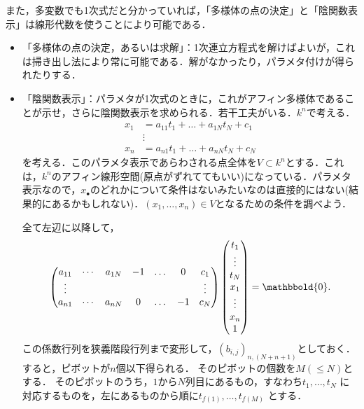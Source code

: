 \documentclass[9pt]{ltjsarticle}
\newcommand{\bbold}{\mathbbold}
\begin{document}
また，多変数でも1次式だと分かっていれば，「多様体の点の決定」と「陰関数表示」は線形代数を使うことにより可能である．
\begin{itemize}
 \item 「多様体の点の決定，あるいは求解」：1次連立方程式を解けばよいが，これは掃き出し法により常に可能である．解がなかったり，パラメタ付けが得られたりする．
 \item 「陰関数表示」：パラメタが1次式のときに，これがアフィン多様体であることが示せ，さらに陰関数表示を求められる．若干工夫がいる．$k^n$で考える．
\begin{align}
 x_1 &=  a_{11} t_1 + \dots + a_{1N}t_N + c_1\\
 & \vdots\\
 x_n & = a_{n1} t_1 + \dots + a_{nN}t_N + c_N
\end{align}
を考える．このパラメタ表示であらわされる点全体を$V\subset k^n$とする．これは，$k^n$のアフィン線形空間(原点がずれててもいい)になっている．パラメタ表示なので，$x_\bullet$のどれかについて条件はないみたいなのは直接的にはない(結果的にあるかもしれない)．$(x_1,\dots,x_n)\in V$となるための条件を調べよう．

全て左辺に以降して，
\begin{align}
\begin{pmatrix}
 a_{11} & \cdots & a_{1N} & -1 & \dots & 0 & c_1\\
 \vdots& & & & & & \vdots\\
 a_{n1} & \cdots & a_{nN} & 0 & \dots & -1 & c_N
\end{pmatrix}
\tatev{t_1 \\ \vdots \\ t_N \\ x_1 \\ \vdots \\ x_n \\ 1}
 =
\bbold{0}.
\end{align}
この係数行列を狭義階段行列まで変形して，$(b_{i,j})_{n,(N+n+1)}$としておく．すると，ピボットが$n$個以下得られる．
そのピボットの個数を$M(\le N)$とする．
そのピボットのうち，$1$から$N$列目にあるもの，すなわち$t_1,\dots,t_N$
に対応するものを，左にあるものから順に$t_{f(1)},\dots, t_{f(M)}$       とする．


\end{itemize}
\end{document}
